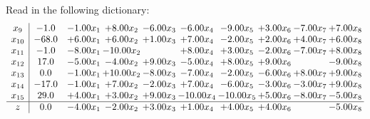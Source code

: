 \documentclass[9pt]{article}
\begin{document}
Read in the following dictionary:
\[\begin{array}{c| c c@{\hskip 2pt} c@{\hskip 2pt} c@{\hskip 2pt} c@{\hskip 2pt} c@{\hskip 2pt} c@{\hskip 2pt} c@{\hskip 2pt} c@{\hskip 2pt} }
 x_{9}   &  -1.0 & -1.00 x_{1} & +  8.00 x_{2} & -6.00 x_{3} & -6.00 x_{4} & -9.00 x_{5} & +  3.00 x_{6} & -7.00 x_{7} & +  7.00 x_{8}\\
 x_{10}   &  -68.0 & +  6.00 x_{1} & +  6.00 x_{2} & +  1.00 x_{3} & +  7.00 x_{4} & -2.00 x_{5} & +  2.00 x_{6} & +  4.00 x_{7} & +  6.00 x_{8}\\
 x_{11}   &  -1.0 & -8.00 x_{1} & -10.00 x_{2} &   & +  8.00 x_{4} & +  3.00 x_{5} & -2.00 x_{6} & -7.00 x_{7} & +  8.00 x_{8}\\
 x_{12}   &  17.0 & -5.00 x_{1} & -4.00 x_{2} & +  9.00 x_{3} & -5.00 x_{4} & +  8.00 x_{5} & +  9.00 x_{6} &   & -9.00 x_{8}\\
 x_{13}   &  0.0 & -1.00 x_{1} & + 10.00 x_{2} & -8.00 x_{3} & -7.00 x_{4} & -2.00 x_{5} & -6.00 x_{6} & +  8.00 x_{7} & +  9.00 x_{8}\\
 x_{14}   &  -17.0 & -1.00 x_{1} & +  7.00 x_{2} & -2.00 x_{3} & +  7.00 x_{4} & -6.00 x_{5} & -3.00 x_{6} & -3.00 x_{7} & +  9.00 x_{8}\\
 x_{15}   &  29.0 & +  4.00 x_{1} & +  3.00 x_{2} & +  9.00 x_{3} & -10.00 x_{4} & -10.00 x_{5} & +  5.00 x_{6} & -8.00 x_{7} & -5.00 x_{8}\\
\hline
z    &  0.0 & -4.00 x_{1} & -2.00 x_{2} & +  3.00 x_{3} & +  1.00 x_{4} & +  4.00 x_{5} & +  4.00 x_{6} &   & -5.00 x_{8}\\
\end{array}\]
\end{document}
